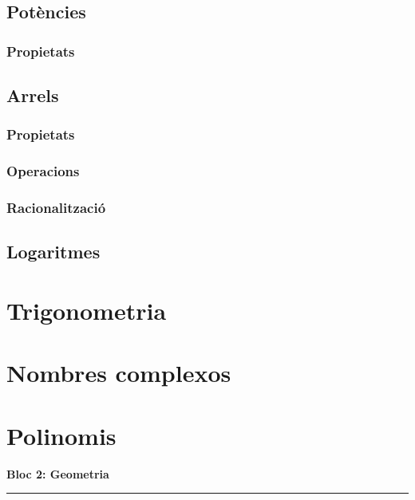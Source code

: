 \documentclass[]{article}
\begin{document}
\subsection{Potències}\label{potuxe8ncies}

\subsubsection{Propietats}\label{propietats}

\subsection{Arrels}\label{arrels}

\subsubsection{Propietats}\label{propietats-1}

\subsubsection{Operacions}\label{operacions}

\subsubsection{Racionalització}\label{racionalitzaciuxf3}

\subsection{Logaritmes}\label{logaritmes}

\section{Trigonometria}\label{trigonometria}

\section{Nombres complexos}\label{nombres-complexos}

\section{Polinomis}\label{polinomis}

\textbf{Bloc 2: Geometria}

\begin{center}\rule{0.5\linewidth}{\linethickness}\end{center}
\end{document}
